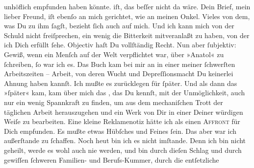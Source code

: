 \begin{ledgroupsized}[t]{13cm}
{{{                  unhöflich empfunden haben könnte.}}}\label{K_L02709-3h} iſt, das beſſer nicht da wäre. Dein
               Brief, mein lieber Freund, iſt {\pb}ebenſo an mich
               gerichtet, wie an meinen Onkel. Vieles von dem, was Du zu ihm ſagſt, bezieht ſich auch auf mich. Und
               ich kann mich von der Schuld nicht freiſprechen, ein wenig die Bitterkeit
               mitveranlaßt zu haben, von der ich Dich erfüllt ſehe. Objectiv haſt Du vollſtändig
               Recht. Nun aber ſubjektiv: Gewiß, wenn ein Menſch auf der Welt verpflichtet war, über
                  »Anatol« zu ſchreiben, ſo war ich es. Das Buch kam bei mir an in einer
               meiner ſchwerſten Arbeitszeiten – Arbeit, von deren Wucht und Depreſ{\pb}ſionsmacht Du keinerlei Ahnung haben kannſt. Ich
               mußte es zurücklegen für ſpäter. Und als dann das »ſpäter« kam, kam über mich das
                  \label{K_L02709-44v}\label{K_L02709-44h}, das Du
               kennſt, mit der Unmöglichkeit, auch nur ein wenig Spannkraft zu finden, um aus dem
               mechaniſchen Trott der täglichen Arbeit herauszugehen und \strikeout{\textcolor{gray}{×}} ein Werk von Dir in
               einer Deiner würdigen Weiſe zu bearbeiten. Eine kleine Reklamenotiz hätte ich als
               einen \textsc{Affront} für Dich empfunden. Es mußte etwas Hübſches
               und Feines {\pb}ſein. Das aber war ich außerſtande zu
               ſchaffen. Noch heut bin ich es nicht imſtande. Denn
               ich bin nicht geheilt, werde es wohl auch nie werden, und bin durch dieſen Schlag und
               durch gewiſſen ſchweren Familien- und Berufs-Kummer, durch die entſetzliche

\end{ledgroupsized}

